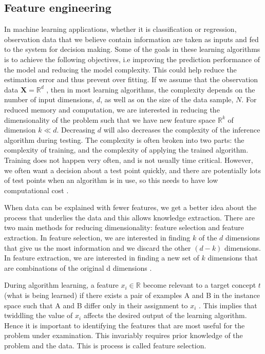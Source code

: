\subsection{Feature engineering}

In machine learning applications, whether it is classification or regression, observation
data that we believe contain information are taken as inputs and fed
to the system for decision making. Some of the goals in these learning algorithms is to achieve the following objectives, i.e improving the prediction performance of the model and reducing the model complexity. This could help reduce the estimation error and thus prevent over fitting. If we  assume that the observation data $\textbf{X}=\mathbb{R}^d$ \citep{shalev2014understanding}, then in most learning algorithms, the complexity depends on the number of
input dimensions, $d$, as well as on the size of the data sample, $N$. 
For reduced memory and computation, we are interested in reducing
the dimensionality of the problem such that we have new feature space $\mathbb{R}^k$ of dimension $k \ll d $. Decreasing $d$ will also decreases the
complexity of the inference algorithm during testing. The
complexity is often broken into two parts: the complexity of training, and the complexity of applying the trained algorithm. Training does not happen very often, and is not usually time critical. However, we often want a decision about a test point quickly, and there are potentially lots of test points when an algorithm is in use, so this needs to have low computational cost \citep{marsland2015machine}.

When data can be explained with fewer features, we get a better idea about the process that underlies the data and this allows knowledge extraction. There are two main methods for reducing dimensionality: feature selection and feature extraction. In feature selection, we are interested in
finding $k$ of the $d$ dimensions that give us the most information and we
discard the other $(d - k)$ dimensions. In feature extraction, we are interested in finding a new set of $k$ dimensions that are combinations of the original d dimensions \citep{alpaydin2014introduction}.
 
During algorithm learning, a feature $x_i\in\mathbb{R}$ become relevant to a target concept $t$ (what is being learned) if there exists a pair of examples A and B in the instance space such that A and B differ only in their assignment to  $x_i$ \citep{blum1997selection}. This implies that twiddling the value of $x_i$ affects the desired output of the learning algorithm. Hence it is important to identifying the features that are most useful for the problem under examination. This invariably requires prior knowledge of the problem and the data. This is process is called feature selection.

